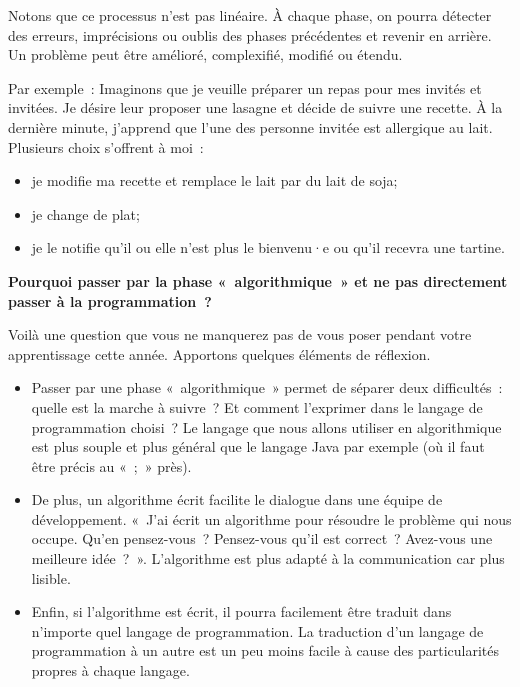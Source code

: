 		Notons que ce processus n’est pas linéaire. À chaque phase, on pourra
		détecter des erreurs, imprécisions ou oublis des phases précédentes et
		revenir en arrière. Un problème peut être amélioré, complexifié, modifié
		ou étendu. 

		Par exemple~: Imaginons que je veuille préparer un repas pour mes
		invités et invitées. Je désire leur proposer une lasagne et décide de
		suivre une recette. À la dernière minute, j'apprend que l'une des
		personne invitée est allergique au lait. Plusieurs choix s'offrent à moi~: 

		\begin{itemize}
			\item je modifie ma recette et remplace le lait par du lait de soja;
			\item je change de plat;
			\item je le notifie qu'il ou elle n'est plus le bienvenu·e ou qu'il 
				recevra une tartine.
		\end{itemize}

	
		\textbf{Pourquoi passer par la phase «~algorithmique~» 
			et ne pas directement passer à la programmation~?}
		
		Voilà une question que vous ne manquerez pas de vous poser 
		pendant votre apprentissage cette année. 
		Apportons quelques éléments de réflexion.
	
		\begin{itemize}
		\item
			Passer par une phase «~algorithmique~» 
			permet de séparer deux difficultés~:~
			quelle est la marche à suivre~? 
			Et comment l’exprimer dans le langage de programmation choisi~? 
			Le langage que nous allons utiliser en algorithmique 
			est plus souple et plus général que le langage Java
			par exemple (où il faut être précis au «~;~» près).
		\item
			De plus, un algorithme écrit facilite le dialogue 
			dans une équipe de développement. 
			«~J’ai écrit un algorithme 
			pour résoudre le problème qui nous occupe. 
			Qu’en pensez-vous~? Pensez-vous qu’il est correct~?
			Avez-vous une meilleure idée~?~». 
			L’algorithme est plus adapté à la communication car plus lisible.
		\item
			Enfin, si l’algorithme est écrit, 
			il pourra facilement être traduit
			dans n’importe quel langage de programmation. 
			La traduction d’un langage de programmation à un autre
			est un peu moins facile 
			à cause des particularités propres à chaque langage.
		\end{itemize}
	
